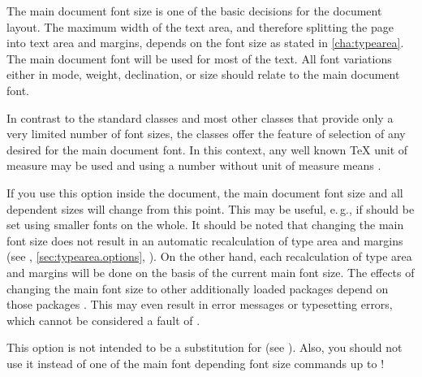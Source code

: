 The main document font size is one of the basic decisions for the document
layout. The maximum width of the text area, and therefore splitting the page
into text area and margins, depends on the font size as stated in
\autoref{cha:typearea}. The main document font will be used for most 
of the text. All font variations either in mode, weight, declination, or size
should relate to the main document font.


\begin{Declaration}
\end{Declaration}
%
In contrast to the standard classes and most other classes that provide only
a very limited number of font sizes, the \KOMAScript{} classes offer the
feature of selection of any desired  for the main document
font. In this context, any well known \TeX{} unit of measure may be used and
using a number without unit of measure means .

If you use this option inside the document, the main document font size and
all dependent sizes will change from this point. This may be useful, e.\,g., if
%
%
%
should be set using smaller fonts on the whole. It should be noted that
changing the main font size does not result in an automatic recalculation of
type area and margins (see ,
\autoref{sec:typearea.options},
). On the other hand, each
recalculation of type area and margins will be done on the basis of the
current main font size. The effects of changing the main font size to other
additionally loaded packages %
%
depend on those packages%
%
. This may even result in error messages or typesetting errors, which cannot
be considered a fault of \KOMAScript.

This option is not intended to be a substitution for
 (see \cite{latex:fntguide}). Also, you should not use it
instead of one of the main font depending font size commands  up
to !%

\fi  %


